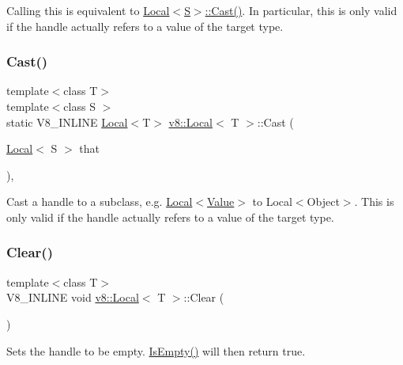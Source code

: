 Calling this is equivalent to \mbox{\hyperlink{classv8_1_1Local_a95c8aa28ad098dd160ddd8cb60377bd6}{Local$<$\+S$>$\+::\+Cast()}}. In particular, this is only valid if the handle actually refers to a value of the target type. \mbox{\label{classv8_1_1Local_a95c8aa28ad098dd160ddd8cb60377bd6}} 
\subsubsection{\texorpdfstring{Cast()}{Cast()}}
{\footnotesize\ttfamily template$<$class T$>$ \\
template$<$class S $>$ \\
static V8\+\_\+\+I\+N\+L\+I\+NE \mbox{\hyperlink{classv8_1_1Local}{Local}}$<$T$>$ \mbox{\hyperlink{classv8_1_1Local}{v8\+::\+Local}}$<$ T $>$\+::Cast (\begin{DoxyParamCaption}\item[{\mbox{\hyperlink{classv8_1_1Local}{Local}}$<$ S $>$}]{that }\end{DoxyParamCaption})\hspace{0.3cm}{\ttfamily [inline]}, {\ttfamily [static]}}

Cast a handle to a subclass, e.\+g. \mbox{\hyperlink{classv8_1_1Local}{Local$<$\+Value$>$}} to Local$<$\+Object$>$. This is only valid if the handle actually refers to a value of the target type. \mbox{\label{classv8_1_1Local_a6fcf63af6bdd697ddd7c3acd16c69899}} 
\subsubsection{\texorpdfstring{Clear()}{Clear()}}
{\footnotesize\ttfamily template$<$class T$>$ \\
V8\+\_\+\+I\+N\+L\+I\+NE void \mbox{\hyperlink{classv8_1_1Local}{v8\+::\+Local}}$<$ T $>$\+::Clear (\begin{DoxyParamCaption}{ }\end{DoxyParamCaption})\hspace{0.3cm}{\ttfamily [inline]}}

Sets the handle to be empty. \mbox{\hyperlink{classv8_1_1Local_aeec81dfca98e0d5b2f26ae13c2d141f4}{Is\+Empty()}} will then return true. \mbox{\label{classv8_1_1Local_aeec81dfca98e0d5b2f26ae13c2d141f4}} 
